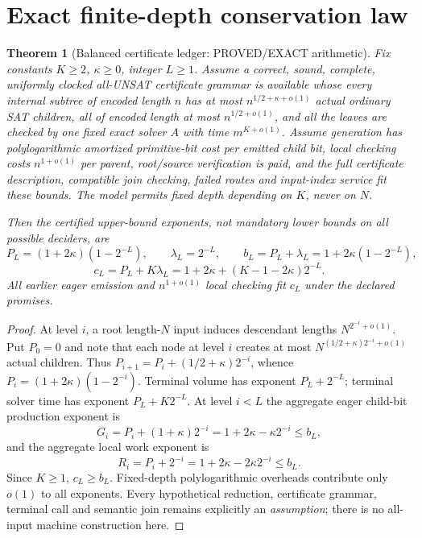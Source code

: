 \documentclass[11pt]{article}
\newtheorem{theorem}{Theorem}
\begin{document}
\section{Exact finite-depth conservation law}
\begin{theorem}[Balanced certificate ledger: PROVED/EXACT arithmetic]
Fix \emph{constants} $K\ge2$, $\kappa\ge0$, integer $L\ge1$.
\emph{Assume} a correct, sound, complete, uniformly clocked all-UNSAT
certificate grammar is available whose every internal subtree of encoded
length $n$ has at most $n^{1/2+\kappa+o(1)}$ actual ordinary SAT children,
all of encoded length at most $n^{1/2+o(1)}$, and all the leaves are
checked by \emph{one fixed} exact solver $A$ with time $m^{K+o(1)}$.
Assume generation has polylogarithmic amortized primitive-bit cost per
emitted child bit, local checking costs $n^{1+o(1)}$ per parent,
root/source verification is paid, and the full certificate description,
compatible join checking, failed routes and input-index service fit these
bounds. The model permits fixed depth depending on $K$, never on $N$.

Then the \emph{certified upper-bound exponents}, not mandatory lower
bounds on all possible deciders, are
\[
P_L=(1+2\kappa)(1-2^{-L}),\qquad
\lambda_L=2^{-L},\qquad
b_L=P_L+\lambda_L=1+2\kappa(1-2^{-L}),
\]
\[
\boxed{c_L=P_L+K\lambda_L
=1+2\kappa+(K-1-2\kappa)2^{-L}.}\tag{1}
\]
All earlier eager emission and $n^{1+o(1)}$ local checking fit
$c_L$ under the declared promises.
\end{theorem}
\begin{proof}
At level $i$, a root length-$N$ input induces descendant lengths
$N^{2^{-i}+o(1)}$. Put $P_0=0$ and note that each node at level $i$
creates at most $N^{(1/2+\kappa)2^{-i}+o(1)}$ actual children.
Thus $P_{i+1}=P_i+(1/2+\kappa)2^{-i}$, whence
$P_i=(1+2\kappa)(1-2^{-i})$.
Terminal volume has exponent $P_L+2^{-L}$; terminal solver time
has exponent $P_L+K2^{-L}$. At level $i<L$ the aggregate eager
child-bit production exponent is
\[
G_i=P_i+(1+\kappa)2^{-i}
=1+2\kappa-\kappa2^{-i}\le b_L,
\]
and the aggregate local work exponent is
\[
R_i=P_i+2^{-i}=1+2\kappa-2\kappa2^{-i}\le b_L.
\]
Since $K\ge1$, $c_L\ge b_L$. Fixed-depth polylogarithmic overheads
contribute only $o(1)$ to all exponents. Every hypothetical reduction,
certificate grammar, terminal call and semantic join remains explicitly
an \emph{assumption}; there is no all-input machine construction here.
\end{proof}
\end{document}
